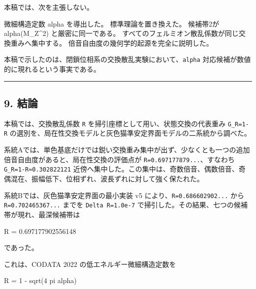 \documentclass[
]{article}
\newenvironment{Shaded}{}{}
\newcommand{\NormalTok}[1]{#1}
\begin{document}
本稿では、次を主張しない。

\begin{Shaded}
\begin{Highlighting}[]
\NormalTok{微細構造定数 alpha を導出した。}
\NormalTok{標準理論を置き換えた。}
\NormalTok{候補帯2が alpha(M\_Z\^{}2) と厳密に同一である。}
\NormalTok{すべてのフェルミオン散乱係数が同じ交換重みへ集中する。}
\NormalTok{倍音自由度の幾何学的起源を完全に説明した。}
\end{Highlighting}
\end{Shaded}

本稿で示したのは、閉鎖位相系の交換散乱実験において、\texttt{alpha}
対応候補が数値的に現れるという事実である。

\begin{center}\rule{0.5\linewidth}{0.5pt}\end{center}

\subsection{9. 結論}\label{ux7d50ux8ad6}

本稿では、交換散乱係数 \texttt{R}
を掃引座標として用い、状態交換の代表重み \texttt{G\_R=1-R}
の選別を、局在性交換モデルと灰色猫準安定界面モデルの二系統から調べた。

系統Aでは、単色基底だけでは鋭い交換重み集中が出ず、少なくとも一つの追加倍音自由度があると、局在性交換の評価点が
\texttt{R=0.697177879...}、すなわち \texttt{G\_R=1-R≈0.302822121}
近傍へ集中した。この集中は、奇数倍音、偶数倍音、奇偶混在、振幅低下、位相ずれ、波長ずれに対して強く保たれた。

系統Bでは、灰色猫準安定界面の最小実装 v5
により、\texttt{R=0.686602902...} から \texttt{R=0.702465367...} までを
\texttt{Delta\ R=1.0e-7}
で掃引した。その結果、七つの候補帯が現れ、最深候補帯は

\begin{Shaded}
\begin{Highlighting}[]
\NormalTok{R = 0.697177902556148}
\end{Highlighting}
\end{Shaded}

であった。

これは、CODATA 2022 の低エネルギー微細構造定数を

\begin{Shaded}
\begin{Highlighting}[]
\NormalTok{R = 1 {-} sqrt(4 pi alpha)}
\end{Highlighting}
\end{Shaded}
\end{document}

